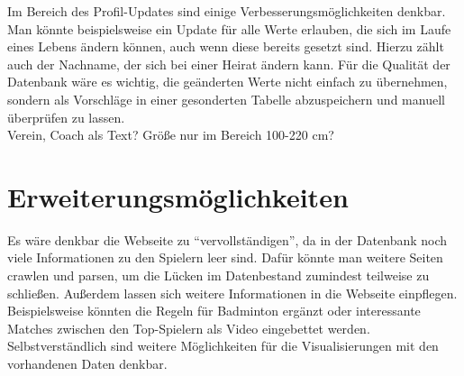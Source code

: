 Im Bereich des Profil-Updates sind einige Verbesserungsmöglichkeiten denkbar. Man könnte beispielsweise ein Update für alle Werte erlauben, die sich im Laufe eines Lebens ändern können, auch wenn diese bereits gesetzt sind. Hierzu zählt auch der Nachname, der sich bei einer Heirat ändern kann. Für die Qualität der Datenbank wäre es wichtig, die geänderten Werte nicht einfach zu übernehmen, sondern als Vorschläge in einer gesonderten Tabelle abzuspeichern und manuell überprüfen zu lassen.\\

Verein, Coach als Text? Größe nur im Bereich 100-220 cm?

\section{Erweiterungsmöglichkeiten}
Es wäre denkbar die Webseite zu "`vervollständigen"', da in der Datenbank noch viele Informationen zu den Spielern leer sind. Dafür könnte man weitere Seiten crawlen und parsen, um die Lücken im Datenbestand zumindest teilweise zu schließen. Außerdem lassen sich weitere Informationen in die Webseite einpflegen. Beispielsweise könnten die Regeln für Badminton ergänzt oder interessante Matches zwischen den Top-Spielern als Video eingebettet werden. Selbstverständlich sind weitere Möglichkeiten für die Visualisierungen mit den vorhandenen Daten denkbar.